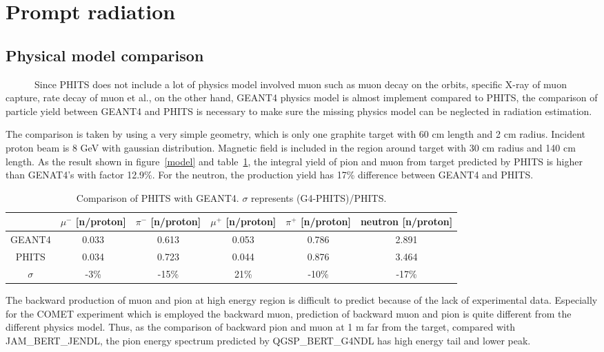  \section{Prompt radiation}
  \subsection{Physical model comparison}
~~~~~~Since PHITS does not include a lot of physics model involved muon such as muon decay on the orbits, specific X-ray of muon capture, rate decay of muon et al., on the other hand, GEANT4 physics model is almost implement compared to PHITS, the comparison of particle yield between GEANT4 and PHITS is necessary to make sure the missing physics model can be neglected in radiation estimation.

The comparison is taken by using a very simple geometry, which is only one graphite target with 60 cm length and 2 cm radius.
Incident proton beam is 8 GeV with gaussian distribution.
Magnetic field is included in the region around target with 30 cm radius and 140 cm length.
As the result shown in figure~\ref{model} and table~\ref{2model}, the integral yield of pion and muon from target predicted by PHITS is higher than GENAT4's with factor 12.9\%.
For the neutron, the production yield has 17\% difference between GEANT4 and PHITS.
\begin{table}[H]
 \centering
 \begin{tabular}{cccccc} \hline \hline
  & $\mu^-$ [n/proton] & $\pi^-$ [n/proton] & $\mu^+$ [n/proton] & $\pi^+$ [n/proton] & neutron [n/proton] \\ \hline
  GEANT4 & 0.033 & 0.613 & 0.053 & 0.786 & 2.891 \\
  PHITS & 0.034 & 0.723 & 0.044 & 0.876 & 3.464 \\ \hline
  $\sigma$ & -3\% & -15\% & 21\% & -10\% & -17\% \\ \hline \hline
 \end{tabular}
 \caption{Comparison of PHITS with GEANT4. $\sigma$ represents (G4-PHITS)/PHITS.}
 \label{2model}
\end{table}
The backward production of muon and pion at high energy region is difficult to predict because of the lack of experimental data.
Especially for the COMET experiment which is employed the backward muon, prediction of backward muon and pion is quite different from the different physics model.
Thus, as the comparison of backward pion and muon at 1 m far from the target, compared with JAM\_BERT\_JENDL, the pion energy spectrum predicted by QGSP\_BERT\_G4NDL has high energy tail and lower peak.
